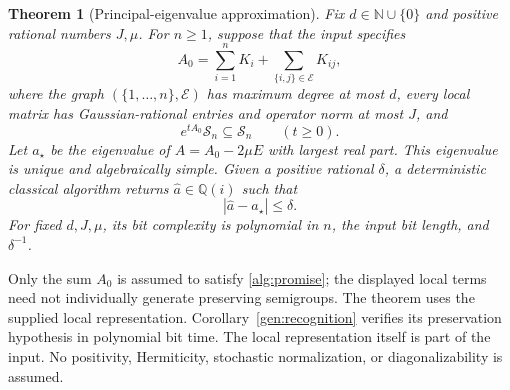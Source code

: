 \documentclass[reqno]{amsart}
\newtheorem{theorem}{Theorem}[section]
\theoremstyle{definition}
\theoremstyle{remark}
\begin{document}
\begin{theorem}[Principal-eigenvalue approximation]
\label{alg:complex}
Fix \(d\in\mathbb N\cup\{0\}\) and positive rational numbers \(J,\mu\).
For \(n\ge1\), suppose that the input specifies
\begin{equation}
 A_0=\sum_{i=1}^n K_i+
       \sum_{\{i,j\}\in\mathcal E}K_{ij},
 \label{alg:local-input}
\end{equation}
where the graph \((\{1,\ldots,n\},\mathcal E)\) has maximum degree at
most \(d\), every local matrix has Gaussian-rational entries and operator
norm at most \(J\), and
\begin{equation}
 e^{tA_0}\mathcal S_n\subseteq\mathcal S_n
 \qquad(t\ge0).
 \label{alg:promise}
\end{equation}
Let \(a_\star\) be the eigenvalue of
\(A=A_0-2\mu E\) with largest real part.  This eigenvalue is unique
and algebraically simple.  Given a positive rational \(\delta\), a
deterministic classical algorithm returns
\(\widehat a\in\mathbb Q(i)\) such that
\[
 |\widehat a-a_\star|\le\delta.
\]
For fixed \(d,J,\mu\), its bit complexity is polynomial in \(n\),
the input bit length, and \(\delta^{-1}\).
\end{theorem}

Only the sum \(A_0\) is assumed to satisfy
\eqref{alg:promise}; the displayed local terms need not individually
generate preserving semigroups.  The theorem uses the supplied local
representation. Corollary~\ref{gen:recognition} verifies its
preservation hypothesis in polynomial bit time. The local representation
itself is part of the input.
No positivity, Hermiticity, stochastic normalization, or diagonalizability
is assumed.
\end{document}
